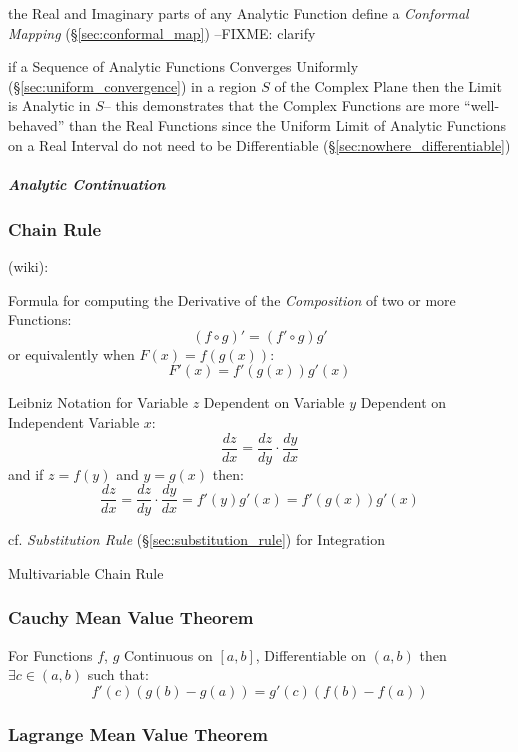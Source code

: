 the Real and Imaginary parts of any Analytic Function define a \emph{Conformal
  Mapping} (\S\ref{sec:conformal_map}) --FIXME: clarify

if a Sequence of Analytic Functions Converges Uniformly
(\S\ref{sec:uniform_convergence}) in a region $S$ of the Complex Plane then the
Limit is Analytic in $S$-- this demonstrates that the Complex Functions are
more ``well-behaved'' than the Real Functions since the Uniform Limit of
Analytic Functions on a Real Interval do not need to be Differentiable
(\S\ref{sec:nowhere_differentiable})



\subparagraph{Analytic Continuation}\label{sec:analytic_continuation}



\subsubsection{Chain Rule}\label{sec:chain_rule}

(wiki):

Formula for computing the Derivative of the \emph{Composition} of two or more
Functions:
\[
  (f \circ g)' = (f' \circ g) g'
\]
or equivalently when $F(x) = f(g(x))$:
\[
  F'(x) = f'(g(x))g'(x)
\]

Leibniz Notation for Variable $z$ Dependent on Variable $y$ Dependent on
Independent Variable $x$:
\[
  \frac{dz}{dx} = \frac{dz}{dy} \cdot \frac{dy}{dx}
\]
and if $z = f(y)$ and $y = g(x)$ then:
\[
  \frac{dz}{dx} = \frac{dz}{dy} \cdot \frac{dy}{dx}
    = f'(y)g'(x) = f'(g(x))g'(x)
\]

\fist cf. \emph{Substitution Rule} (\S\ref{sec:substitution_rule}) for
Integration

Multivariable Chain Rule



\subsubsection{Cauchy Mean Value Theorem}
\label{sec:cauchy_mean_value}

For Functions $f$, $g$ Continuous on $[a,b]$, Differentiable on
$(a,b)$ then $\exists c \in (a,b)$ such that:
\[
  f'(c) (g(b) - g(a)) = g'(c) (f(b) - f(a))
\]



\subsubsection{Lagrange Mean Value Theorem}
\label{sec:lagrange_mean_value}

